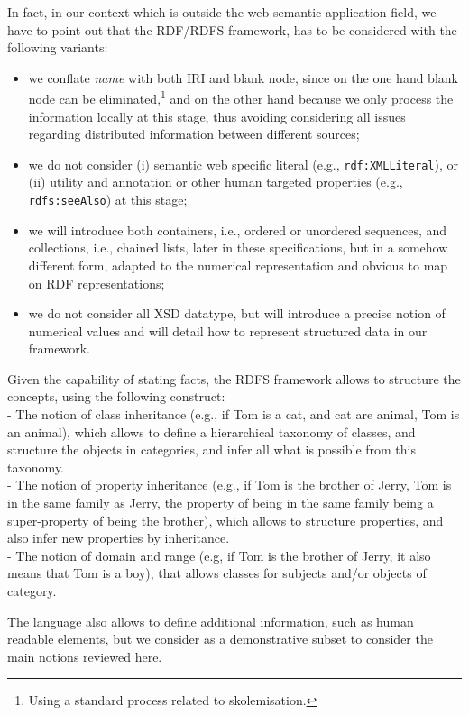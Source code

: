In fact, in our context which is outside the web semantic application field, we have to point out that the RDF/RDFS framework, has to be considered with the following variants:
\begin{itemize}
    \item we conflate \emph{name} with both IRI and blank node, since on the one hand blank node can be eliminated,\footnote{Using a standard process related to skolemisation.} and on the other hand because we only process the information locally at this stage, thus avoiding considering all issues regarding distributed information between different sources;
    \item we do not consider (i) semantic web specific literal (e.g., \texttt{rdf:XMLLiteral}), or (ii) utility and annotation or other human targeted  properties (e.g., \texttt{rdfs:seeAlso}) at this stage;
    \item we will introduce both containers, i.e., ordered or unordered sequences, and collections, i.e., chained lists, later in these specifications, but in a somehow different form, adapted to the numerical representation and obvious to map on RDF representations;
    \item we do not consider all XSD datatype, but will introduce a precise notion of numerical values and will detail how to represent structured data in our framework.
\end{itemize}

Given the capability of stating facts, the RDFS framework allows to structure the concepts, using the following construct:
\\ - The notion of class inheritance (e.g., if Tom is a cat, and cat are animal, Tom is an animal), which allows to define a hierarchical taxonomy of classes, and structure the objects in categories, and infer all what is possible from this taxonomy.
\\ - The notion of property inheritance (e.g., if Tom is the brother of Jerry, Tom is in the same family as Jerry, the property of being in the same family being a super-property of being the brother), which allows to structure properties, and also infer new properties by inheritance.
\\ - The notion of domain and range (e.g, if Tom is the brother of Jerry, it also means that Tom is a boy), that allows classes for subjects and/or objects of category.

The language also allows to define additional information, such as human readable elements, but we consider as a demonstrative subset to consider the main notions reviewed here.

